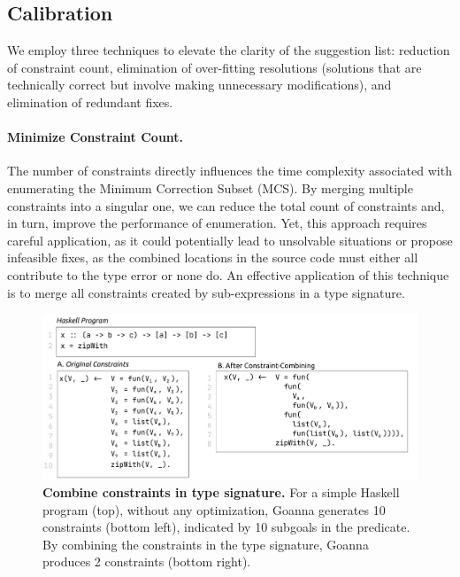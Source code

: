 \documentclass[pdflatex,sn-mathphys-num]{sn-jnl}%
\begin{document}
    
    \subsection{Calibration} \label{sub:optimization}
    
    We employ three techniques to elevate the clarity of the suggestion list: reduction of constraint count, elimination of over-fitting resolutions (solutions that are technically correct but involve making unnecessary modifications), and elimination of redundant fixes.

    \paragraph{Minimize Constraint Count.}
    The number of constraints directly influences the time complexity associated with enumerating the Minimum Correction Subset (MCS). By merging multiple constraints into a singular one, we can reduce the total count of constraints and, in turn, improve the performance of enumeration. Yet, this approach requires careful application, as it could potentially lead to unsolvable situations or propose infeasible fixes, as the combined locations in the source code must either all contribute to the type error or none do. An effective application of this technique is to merge all constraints created by sub-expressions in a type signature.

   \begin{figure}[ht!]
        \centering
        \includegraphics[width=\linewidth]{images/Combine-Constraints}
        \caption[Combine constraints in type signature]{\textbf{Combine constraints in type signature.} For a simple Haskell program (top),  without any optimization, Goanna generates 10 constraints (bottom left), indicated by 10 subgoals in the predicate. By combining the constraints in the type signature, Goanna produces 2 constraints (bottom right).}
        \label{fig:combine-constraints}
    \end{figure}
\end{document}
